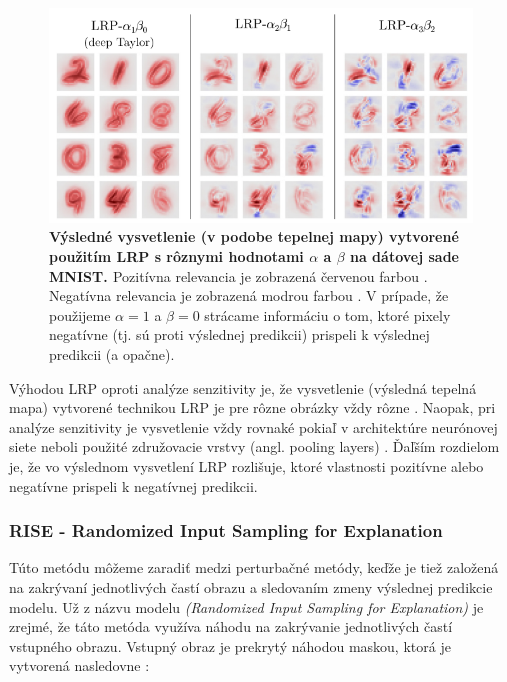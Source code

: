 \begin{figure}[h!]
\centering
\includegraphics[scale=0.5]{assets/images/lrp.png}
\caption{\textbf{Výsledné vysvetlenie (v podobe tepelnej mapy) vytvorené použitím LRP s rôznymi hodnotami $\alpha$ a $\beta$ na dátovej sade MNIST. \cite{montavon2018methods}} Pozitívna relevancia je zobrazená červenou farbou \cite{montavon2018methods}. Negatívna relevancia je zobrazená modrou farbou \cite{montavon2018methods}. V prípade, že použijeme $\alpha = 1$ a $\beta = 0$ strácame informáciu o tom, ktoré pixely negatívne (tj. sú proti výslednej predikcii) prispeli k výslednej predikcii (a opačne).}
\label{fig:lrp}
\end{figure}

Výhodou LRP oproti analýze senzitivity je, že vysvetlenie (výsledná tepelná mapa) vytvorené technikou LRP je pre rôzne obrázky vždy rôzne \cite{Muller_Samek_Montavon_Lapuschkin_Arras}. Naopak, pri analýze senzitivity je vysvetlenie vždy rovnaké pokiaľ v architektúre neurónovej siete neboli použité združovacie vrstvy (angl. pooling layers) \cite{Muller_Samek_Montavon_Lapuschkin_Arras}. Ďaľším rozdielom je, že vo výslednom vysvetlení LRP rozlišuje, ktoré vlastnosti pozitívne alebo negatívne prispeli k negatívnej predikcii.


\subsubsection{RISE - Randomized Input Sampling for Explanation \label{sec:rise}}

Túto metódu môžeme zaradiť medzi perturbačné metódy, keďže je tiež založená na zakrývaní jednotlivých častí obrazu a sledovaním zmeny výslednej predikcie modelu. Už z názvu modelu \textit{(Randomized Input Sampling for Explanation)} je zrejmé, že táto metóda využíva náhodu na zakrývanie jednotlivých častí vstupného obrazu. Vstupný obraz je prekrytý náhodou maskou, ktorá je vytvorená nasledovne \cite{petsiuk2018rise}:

